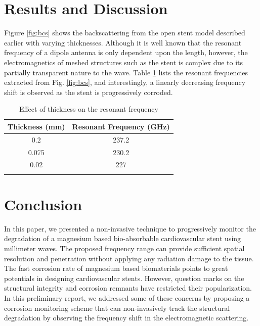 \documentclass[conference,a4paper]{IEEEtran}
\begin{document}
\section{Results and Discussion}
%
Figure \ref{fig:bcs} shows the backscattering from the open stent model described earlier with varying thicknesses. Although it is well known that the resonant frequency of a dipole antenna is only dependent upon the length, however, the electromagnetics of meshed structures such as the stent is complex due to its partially transparent nature to the wave. Table \ref{tab:resonance} lists the resonant frequencies extracted from Fig. \ref{fig:bcs}, and interestingly, a linearly decreasing frequency shift is observed as the stent is progressively corroded.
%
\begin{table}[!h]
  \centering
  \renewcommand{\arraystretch}{1.3}
  \caption{Effect of thickness on the resonant frequency}
  \centering
  \begin{tabularx}{.65\columnwidth}{c c}
    \toprule
    Thickness (mm) & Resonant Frequency (GHz)\\
    \midrule \midrule
    \num{0.2} & \num{237.2} \\
    \num{0.075} & \num{230.2} \\
    \num{0.02} & \num{227} \\
    \bottomrule \\
  \end{tabularx}
  \label{tab:resonance}
\end{table}
%

\vspace{7pt}
\section{Conclusion}
%
In this paper, we presented a non-invasive technique to progressively monitor the degradation of a magnesium based bio-absorbable cardiovascular stent using millimeter waves.
The proposed frequency range can provide sufficient spatial resolution and penetration without applying any radiation damage to the tissue. The fast corrosion rate of magnesium based biomaterials points to great potentials in designing cardiovascular stents. However, question marks on the structural integrity and corrosion remnants have restricted their popularization. In this preliminary report, we addressed some of these concerns by proposing a corrosion monitoring scheme that can non-invasively track the structural degradation by observing the frequency shift in the electromagnetic scattering.
\vspace{7pt}
\end{document}
